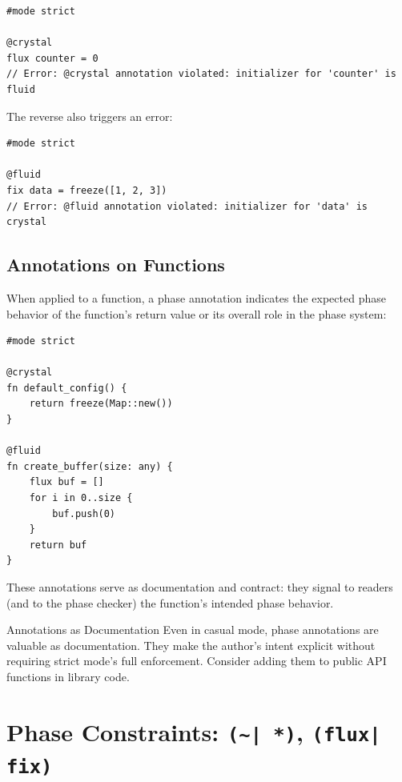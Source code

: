 \begin{lstlisting}[language=Lattice, caption={Annotation violation}]
#mode strict

@crystal
flux counter = 0
// Error: @crystal annotation violated: initializer for 'counter' is fluid
\end{lstlisting}

The reverse also triggers an error:

\begin{lstlisting}[language=Lattice, caption={Reverse annotation violation}]
#mode strict

@fluid
fix data = freeze([1, 2, 3])
// Error: @fluid annotation violated: initializer for 'data' is crystal
\end{lstlisting}

\subsection{Annotations on Functions}

When applied to a function, a phase annotation indicates the expected phase behavior of the function's return value or its overall role in the phase system:

\begin{lstlisting}[language=Lattice, caption={Annotated functions}]
#mode strict

@crystal
fn default_config() {
    return freeze(Map::new())
}

@fluid
fn create_buffer(size: any) {
    flux buf = []
    for i in 0..size {
        buf.push(0)
    }
    return buf
}
\end{lstlisting}

These annotations serve as documentation and contract: they signal to readers (and to the phase checker) the function's intended phase behavior.

\begin{tipbox}{Annotations as Documentation}
Even in casual mode, phase annotations are valuable as documentation.
They make the author's intent explicit without requiring strict mode's full enforcement.
Consider adding them to public API functions in library code.
\end{tipbox}


\section{Phase Constraints: \texttt{(\textasciitilde|\,*)}, \texttt{(flux|\,fix)}}\label{sec:phase-constraints}

